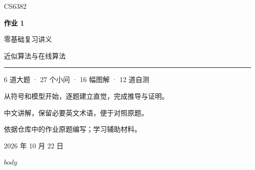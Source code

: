 \documentclass[11pt,a4paper,fontset=none]{ctexart}
\begin{document}
\begin{titlepage}
\color{ink}
\vspace*{20mm}
{\sffamily\color{accent}\Large CS6382\par}
\vspace{8mm}
{\sffamily\bfseries\fontsize{31}{42}\selectfont 作业 1\par 零基础复习讲义\par}
\vspace{9mm}
{\Large 近似算法与在线算法\par}
\vspace{14mm}
{\color{accent}\rule{\linewidth}{1.4pt}}
\vspace{8mm}
{\large 6 道大题 · 27 个小问 · 16 幅图解 · 12 道自测\par}
\vspace{5mm}
从符号和模型开始，逐题建立直觉，完成推导与证明。\par
中文讲解，保留必要英文术语，便于对照原题。\par
\vfill
{\small 依据仓库中的作业原题编写；学习辅助材料。\par}
{\small 2026 年 10 月 22 日\par}
\end{titlepage}
\tableofcontents
\clearpage
{}
$body$
\end{document}
